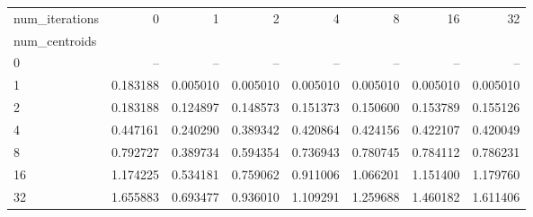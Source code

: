 \begin{tabular}{lrrrrrrr}
\toprule
num\_iterations &        0  &        1  &        2  &        4  &        8  &        16 &        32 \\
num\_centroids &           &           &           &           &           &           &           \\
\midrule
0             &       -- &       -- &       -- &       -- &       -- &       -- &       -- \\
1             &  0.183188 &  0.005010 &  0.005010 &  0.005010 &  0.005010 &  0.005010 &  0.005010 \\
2             &  0.183188 &  0.124897 &  0.148573 &  0.151373 &  0.150600 &  0.153789 &  0.155126 \\
4             &  0.447161 &  0.240290 &  0.389342 &  0.420864 &  0.424156 &  0.422107 &  0.420049 \\
8             &  0.792727 &  0.389734 &  0.594354 &  0.736943 &  0.780745 &  0.784112 &  0.786231 \\
16            &  1.174225 &  0.534181 &  0.759062 &  0.911006 &  1.066201 &  1.151400 &  1.179760 \\
32            &  1.655883 &  0.693477 &  0.936010 &  1.109291 &  1.259688 &  1.460182 &  1.611406 \\
\bottomrule
\end{tabular}
